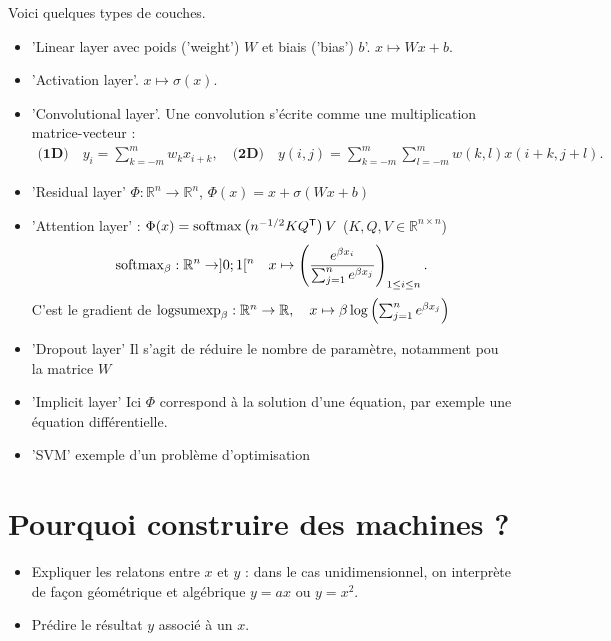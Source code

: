 \documentclass[11pt,a4paper]{article}
\newcommand{\R}{\mathbb R}
\newcommand{\transpose}[1]{{#1}^{\mathsf{T}}}
\begin{document}
%
Voici quelques types de couches.
%
\begin{itemize}
\item 'Linear layer avec poids ('weight') $W$ et biais ('bias') $b$'. $x \mapsto W x + b$.
\item 'Activation layer'. $x \mapsto \sigma(x)$.
\item 'Convolutional layer'. Une convolution s'écrite comme une multiplication matrice-vecteur :
\begin{align*}
\textbf{(1D)}\quad y_i = \sum_{k=-m}^m w_k x_{i+k},\quad \textbf{(2D)}\quad y(i,j) = \sum_{k=-m}^m\sum_{l=-m}^m w(k,l) x(i+k, j+l).
\end{align*}

\item 'Residual layer' $\Phi:\R^n\to\R^n$, $\Phi(x) = x +\sigma(W x + b)$
\item 'Attention layer' : $\Phi(x) = {\rm softmax}\left(n^{-1/2} K \transpose{Q}\right)V$ ($K,Q,V\in\R^{n\times n}$)
\begin{align*}
{\rm softmax}_{\beta}: \R^n\to]0;1[^n\quad x\mapsto \left(\frac{e^{\beta x_i}}{\sum_{j=1}^n e^{\beta x_j}}\right)_{1\le i\le n}.
\end{align*}
C'est le gradient de  ${\rm logsumexp}_{\beta}: \R^n\to\R,\quad x\mapsto \beta\log\left(\sum_{j=1}^n e^{\beta x_j}\right)$
\item 'Dropout layer' Il s'agit de réduire le nombre de paramètre, notamment pou la matrice $W$
\item 'Implicit layer' Ici $\Phi$ correspond à la solution d'une équation, par exemple une équation différentielle.
\item 'SVM' exemple d'un problème d'optimisation
\end{itemize}
%
\section{Pourquoi construire des machines ?}\label{sec:}
%
\begin{itemize}
\item Expliquer les relatons entre $x$ et $y$ : dans le cas unidimensionnel, on interprète de façon géométrique et algébrique $y=a x$ ou $y=x^2$.
\item Prédire le résultat $y$ associé à un $x$.
\end{itemize}
%
\end{document}
